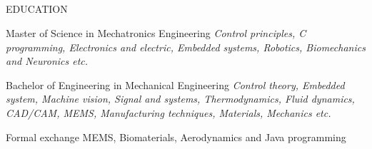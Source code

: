 \documentclass{my_cv}
\begin{document}
\begin{multicols}{2}

\section{\faGraduationCap}{EDUCATION}

{Master of Science in Mechatronics Engineering} %
{\textit{Control principles, C programming, Electronics and electric, Embedded systems, Robotics, Biomechanics and Neuronics etc.}}
    
{Bachelor of Engineering in Mechanical Engineering} %
{\textit{Control theory, Embedded system, Machine vision, Signal and systems, Thermodynamics, Fluid dynamics, CAD/CAM, MEMS, Manufacturing techniques, Materials, Mechanics etc.}}

{Formal exchange} %
{MEMS, Biomaterials, Aerodynamics and Java programming}



\end{multicols}
\end{document}
